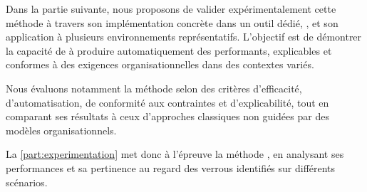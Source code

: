 \noindent
Dans la partie suivante, nous proposons de valider expérimentalement cette méthode à travers son implémentation concrète dans un outil dédié, , et son application à plusieurs environnements représentatifs. L'objectif est de démontrer la capacité de  à produire automatiquement des  performants, explicables et conformes à des exigences organisationnelles dans des contextes variés.

\medskip

\noindent
Nous évaluons notamment la méthode selon des critères d'efficacité, d'automatisation, de conformité aux contraintes et d'explicabilité, tout en comparant ses résultats à ceux d'approches classiques non guidées par des modèles organisationnels.

\bigskip

La \autoref{part:experimentation} met donc à l'épreuve la méthode , en analysant ses performances et sa pertinence au regard des verrous identifiés sur différents scénarios.
